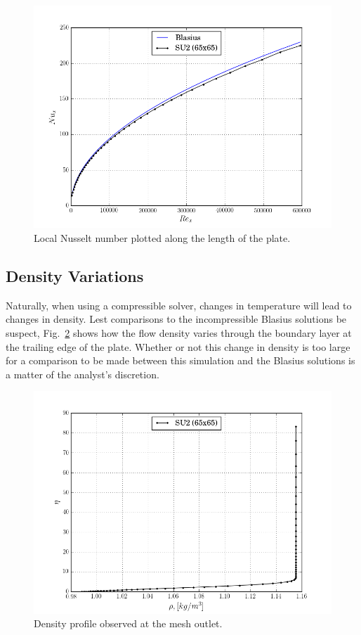 \documentclass[12pt,letterpaper]{article}
\begin{document}
\begin{figure}[h] 
\centering
\includegraphics[width=\linewidth]{Nu_350.png}
\caption{Local Nusselt number plotted along the length of the plate.}
\label{fig:Nu}
\end{figure}

\subsection*{Density Variations}
Naturally, when using a compressible solver, changes in temperature will lead to changes in density. Lest comparisons to the incompressible Blasius solutions be suspect, Fig.~\ref{fig:rho} shows how the flow density varies through the boundary layer at the trailing edge of the plate. Whether or not this change in density is too large for a comparison to be made between this simulation and the Blasius solutions is a matter of the analyst's discretion.

\begin{figure}[h] 
\centering
\includegraphics[width=\linewidth]{rho_profile.png}
\caption{Density profile observed at the mesh outlet.}
\label{fig:rho}
\end{figure}
\end{document}
